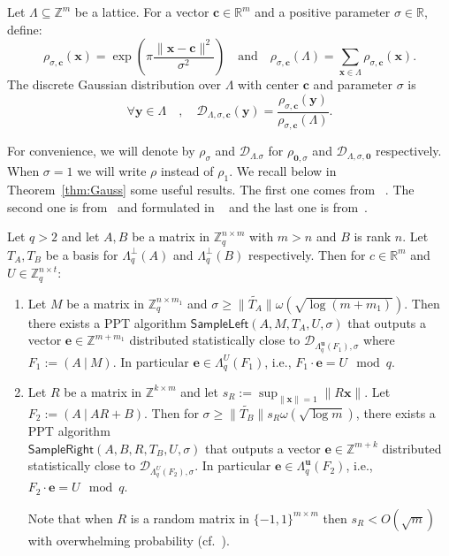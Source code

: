 \documentclass[runningheads]{llncs}
\def\ZZ{\mathbb{Z}}
\def\RR{\mathbb{R}}
\def\cal{\mathcal}
\def\bf{\mathbf}
\def\SampleLeft{\mathsf{SampleLeft}}
\def\SampleRight{\mathsf{SampleRight}}
\def\Pr{\mathrm{Pr}}
\def\u{\bf{u}}
\def\e{\bf{e}}
\def\x{\bf{x}}
\def\L{\Lambda}
\def\Lp{\Lambda^{\perp}}
\def\c{\bf{c}}
\def\DuA{\cal{D}_{\L_q^{\u}(A),\sigma}}
\begin{document}
	\begin{definition}
		Let $\L\subseteq\ZZ^m$ be a lattice. For a vector $\bf{c}\in\RR^m$ and a positive parameter $\sigma\in\RR$, define:
		$$\rho_{\sigma,\c}(\x)=\exp\left(\pi\frac{\|\x-\c\|^2}{\sigma^2}\right)\quad\text{and}\quad
		\rho_{\sigma,\c}(\L)=\sum_{\x\in\L}\rho_{\sigma,\c}(\x).    $$
		The discrete Gaussian distribution over $\L$ with center $\c$ and parameter $\sigma$ is
		$$\forall \bf{y}\in\L\quad,\quad\cal{D}_{\L,\sigma,\c}(\bf{y})=\frac{\rho_{\sigma,\c}(\bf{y})}{\rho_{\sigma,\c}(\L)}.$$
	\end{definition}
	For convenience, we will denote by $\rho_\sigma$ and $\cal{D}_{\L.\sigma}$ for $\rho_{\bf{0},\sigma}$ and $\cal{D}_{\L,\sigma,\bf{0}}$ respectively. When $\sigma=1$ we will write $\rho$ instead of $\rho_1$. We recall below in Theorem~\ref{thm:Gauss} some useful results. The first one comes from~{\cite[Lemma 4.4]{MR04}} . The second one is from~\cite{CHKP10} and formulated in ~{\cite[Theorem 17]{ABB10-EuroCrypt}} and the last one is from~{\cite[Theorem 19]{ABB10-EuroCrypt}}.
	
	\begin{theorem}\label{thm:Gauss}
		Let $q> 2$ and let $A, B$ be a matrix in $\ZZ_q^{n\times m}$ with $m>n$ and $B$ is rank $n$. Let $T_A, T_B$ be a basis for $\Lp_q(A)$ and  $\Lp_q(B)$ respectively.
		Then for $c\in\RR^m$ and $U\in\ZZ_q^{n\times t}$:
		\begin{enumerate}
			\item Let $M$ be a matrix in $\ZZ_q^{n\times m_1}$ and $\sigma\geq\|\widetilde{T_A}\|\omega(\sqrt{\log(m+m_1)})$. Then there exists a PPT algorithm $\SampleLeft(A,M,T_A,U,\sigma)$ that outputs a vector $\e\in\ZZ^{m+m_1}$ distributed statistically close to $\cal{D}_{\L_q^{\u}(F_1),\sigma}$ where $F_1:=(A~|~M)$. In particular $\e\in \L_q^{U}(F_1)$, i.e., $F_1\cdot\e=U\mod q$.
			\item Let $R$ be a matrix in $\ZZ^{k\times m}$ and let $s_R:=\sup_{\|\x\|=1}\|R\x\|$. Let $F_2:=(A~|~AR+B)$. Then for  $\sigma\geq\|\widetilde{T_B}\|s_R\omega(\sqrt{\log m})$, there exists a PPT algorithm \\$\SampleRight(A,B,R,T_B,U,\sigma)$ that outputs a vector $\e\in\ZZ^{m+k}$ distributed statistically close to $\cal{D}_{\L_q^{U}(F_2),\sigma}$. In particular $\e\in \L_q^{\u}(F_2)$, i.e., $F_2\cdot\e=U\mod q$. 
			
			Note that when $R$ is a random matrix in $\{-1,1\}^{m\times m}$ then $s_R<O(\sqrt{m})$ with overwhelming probability (cf.~{\cite[Lemma 15]{ABB10-EuroCrypt}}).
		\end{enumerate}
	\end{theorem}
	
\end{document}

